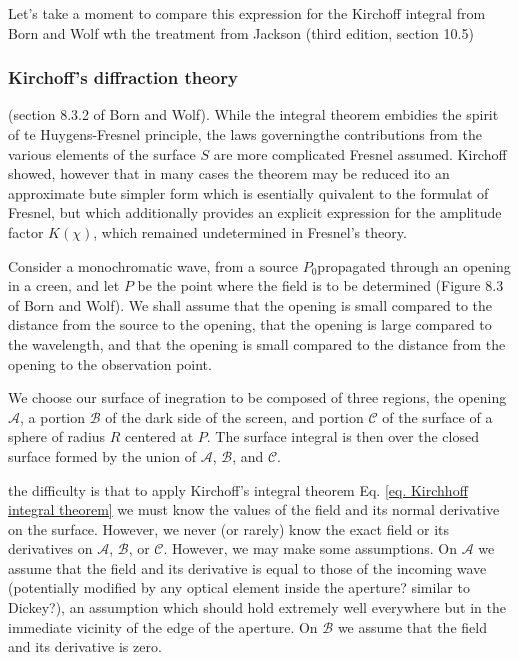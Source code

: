 \documentclass[../../main.tex]{subfiles} %
\begin{document}
\begin{aside}
    Let's take a moment to compare this expression for the Kirchoff integral from Born and Wolf wth the treatment from Jackson (third edition, section 10.5)
\end{aside}

\subsubsection{Kirchoff's diffraction theory}
(section 8.3.2 of Born and Wolf). While the integral theorem embidies the spirit of te Huygens-Fresnel principle, the laws governingthe contributions from the various elements of the surface $S$ are more complicated Fresnel assumed. Kirchoff showed, however that in many cases the theorem may be reduced ito an approximate bute simpler form which is esentially quivalent to the formulat of Fresnel, but which additionally provides an explicit expression for the amplitude factor $K(\chi)$, which remained undetermined in Fresnel's theory.

Consider a monochromatic wave, from a source $P_0$propagated through an opening in a creen, and let $P$ be the point where the field is to be determined (Figure 8.3 of Born and Wolf). We shall assume that the opening is small compared to the distance from the source to the opening, that the opening is large compared to the wavelength, and that the opening is small compared to the distance from the opening to the observation point. 

We choose our surface of inegration to be composed of three regions, the opening $\mathcal{A}$, a portion $\mathcal{B}$ of the dark side of the screen, and portion $\mathcal{C}$ of the surface of a sphere of radius $R$ centered at $P$. The surface integral is then over the closed surface formed by the union of $\mathcal{A}$, $\mathcal{B}$, and $\mathcal{C}$. 

the difficulty is that to apply Kirchoff's integral theorem Eq. \ref{eq. Kirchhoff integral theorem} we must know the values of the field and its normal derivative on the surface. However, we never (or rarely) know the exact field or its derivatives on  $\mathcal{A}$, $\mathcal{B}$, or $\mathcal{C}$. However, we may make some assumptions. On $\mathcal{A}$ we assume that the field and its derivative is equal to those of the incoming wave (potentially modified by any optical element inside the aperture? similar to Dickey?), an assumption which should hold extremely well everywhere but in the immediate vicinity of the edge of the aperture. On $\mathcal{B}$ we assume that the field and its derivative is zero. 
\end{document}
